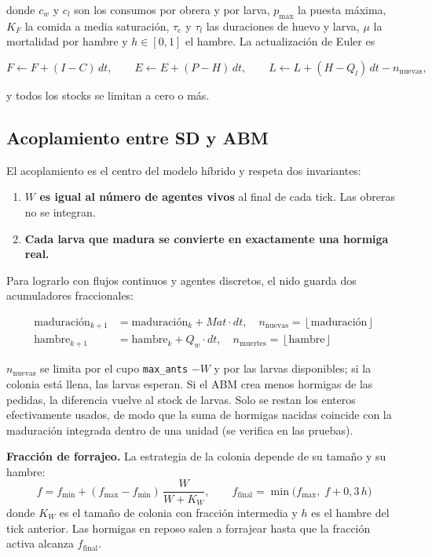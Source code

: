 \documentclass[11pt,a4paper]{article}
\newcommand{\code}[1]{\texttt{\small #1}}
\begin{document}
donde $c_w$ y $c_l$ son los consumos por obrera y por larva, $p_{\max}$ la puesta máxima, $K_F$ la comida a media saturación, $\tau_e$ y $\tau_l$ las duraciones de huevo y larva, $\mu$ la mortalidad por hambre y $h\in[0,1]$ el hambre. La actualización de Euler es

\begin{equation}
F \leftarrow F + (I-C)\,dt,\qquad
E \leftarrow E + (P-H)\,dt,\qquad
L \leftarrow L + (H-Q_l)\,dt - n_{\text{nuevas}},
\end{equation}

y todos los stocks se limitan a cero o más.

\subsection{Acoplamiento entre SD y ABM}\label{sec:acoplamiento}

El acoplamiento es el centro del modelo híbrido y respeta dos invariantes:

\begin{enumerate}
  \item \textbf{$W$ es igual al número de agentes vivos} al final de cada tick. Las obreras no se integran.
  \item \textbf{Cada larva que madura se convierte en exactamente una hormiga real.}
\end{enumerate}

Para lograrlo con flujos continuos y agentes discretos, el nido guarda dos acumuladores fraccionales:

\begin{align}
\text{maduración}_{k+1} &= \text{maduración}_k + Mat\cdot dt, \quad n_{\text{nuevas}} = \left\lfloor \text{maduración} \right\rfloor \\
\text{hambre}_{k+1} &= \text{hambre}_k + Q_w\cdot dt, \quad n_{\text{muertes}} = \left\lfloor \text{hambre} \right\rfloor
\end{align}

$n_{\text{nuevas}}$ se limita por el cupo \code{max\_ants} $-W$ y por las larvas disponibles; si la colonia está llena, las larvas esperan. Si el ABM crea menos hormigas de las pedidas, la diferencia vuelve al stock de larvas. Solo se restan los enteros efectivamente usados, de modo que la suma de hormigas nacidas coincide con la maduración integrada dentro de una unidad (se verifica en las pruebas).

\textbf{Fracción de forrajeo.} La estrategia de la colonia depende de su tamaño y su hambre:
\begin{equation}
f = f_{\min} + (f_{\max}-f_{\min})\,\frac{W}{W+K_W}, \qquad f_{\text{final}} = \min\!\bigl(f_{\max},\; f + 0{,}3\,h\bigr)
\end{equation}
donde $K_W$ es el tamaño de colonia con fracción intermedia y $h$ es el hambre del tick anterior. Las hormigas en reposo salen a forrajear hasta que la fracción activa alcanza $f_{\text{final}}$.
\end{document}
